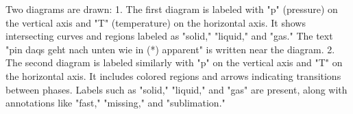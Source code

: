 Two diagrams are drawn:  
1. The first diagram is labeled with "p" (pressure) on the vertical axis and "T" (temperature) on the horizontal axis. It shows intersecting curves and regions labeled as "solid," "liquid," and "gas." The text "pin daqs geht nach unten wie in (*) apparent" is written near the diagram.  
2. The second diagram is labeled similarly with "p" on the vertical axis and "T" on the horizontal axis. It includes colored regions and arrows indicating transitions between phases. Labels such as "solid," "liquid," and "gas" are present, along with annotations like "fast," "missing," and "sublimation."